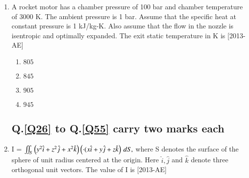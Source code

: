 \documentclass[journal,12pt,onecolumn]{IEEEtran}
\theoremstyle{remark}
\begin{document}
\begin{enumerate}
\begin{enumerate}
    \end{enumerate}


    \item A rocket motor has a chamber pressure of 100 bar and chamber temperature of 3000 K. The ambient pressure is 1 bar. Assume that the specific heat at constant pressure is 1 kJ/kg-K. Also assume that the flow in the nozzle is isentropic and optimally expanded. The exit static temperature in K is  \hfill{[2013-AE]}

    \begin{enumerate}
        \item $805$
        \item $845$
        \item $905$
        \item $945$
    \end{enumerate}

    \subsection{Q.\ref{Q26} to Q.\ref{Q55} carry two marks each} \label{subsec:twomarks}

    \item \label{Q26} I = $\iint_S \left( y^2 \hat{i} + z^2 \hat{j} + x^2 \hat{k} \right)\left( \cdot ( x \hat{i} + y \hat{j} + z \hat{k}\right) \, dS,$  where S denotes the surface of the sphere of unit radius centered at the origin. Here $\hat{i}, \hat{j}$ and $\hat{k}$  denote three orthogonal unit vectors. The value of I is \underline{\hspace{2cm}} \hfill{[2013-AE]}



    
\end{enumerate}
\end{document}

